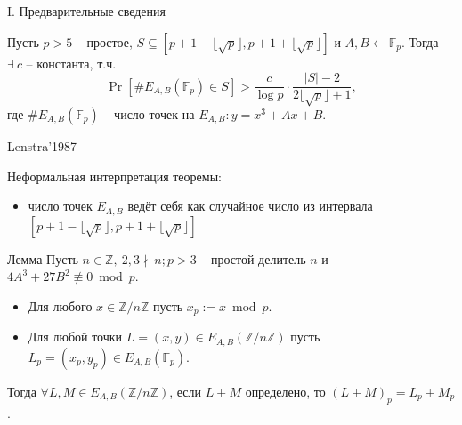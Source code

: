 \documentclass{beamer}
\begin{document}
\begin{frame}{I. Предварительные сведения}
	\begin{center}
		\begin{tcolorbox}[enhanced,hbox,colback=title-and-section-color!5,colframe=title-and-section-color!120,title= Теорема о распределении порядков случайных ЭК,center title]
			\begin{varwidth}{\textwidth}
				\begin{center}
					Пусть $p>5$ -- простое, $S \subseteq [ p+1-\lfloor\sqrt{p}\rfloor, p+1+\lfloor\sqrt{p}\rfloor ]$ и $A, B \leftarrow \mathbb{F}_p$. Тогда $\exists\ c$ -- константа, т.ч.
					\[
					\Pr\left[\#E_{A,B}(\mathbb{F}_p) \in S \right] > \frac{c}{\log p} \cdot \frac{|S|-2}{2\lfloor\sqrt{p}\rfloor + 1},
					\]
					где $\#E_{A,B}(\mathbb{F}_p)$ -- число точек на $E_{A,B}: y = x^3 + Ax+B$.
				\end{center}
			\end{varwidth}
		\end{tcolorbox}	
	\end{center}

    \structure{$\triangleleft$}  Lenstra'1987 \structure{$\triangleright$}
\end{frame}

\begin{frame}
	Неформальная интерпретация теоремы:
	\vspace{0.5em}
	\begin{itemize}
		\item число точек $E_{A,B}$ ведёт себя как случайное число из интервала $\left[p+1-\lfloor\sqrt{p}\rfloor, p+1+\lfloor\sqrt{p}\rfloor \right]$
	\end{itemize}
	
\end{frame}

\begin{frame}
\begin{block}{Лемма}
    Пусть $n \in \mathbb{Z},\ 2,3\nmid \ n; p>3$ -- простой делитель $n$ и $4A^3 + 27B^2 \not\equiv 0\bmod p$.
    \begin{itemize}
        \item Для любого $x \in \mathbb{Z}/n\mathbb{Z}$ пусть $x_p := x\bmod p$.
        \item Для любой точки $L = (x,y) \in E_{A,B}( \mathbb{Z}/n\mathbb{Z})$ пусть $L_p = (x_p, y_p) \in E_{A,B}(\mathbb{F}_p)$.  %
    \end{itemize}  
    
    Тогда $\forall L, M \in E_{A,B}(\mathbb{Z}/n\mathbb{Z})$, если $L+M$ определено, то $(L+M)_p = L_p+M_p$.
\end{block}
\end{frame}
\end{document}
